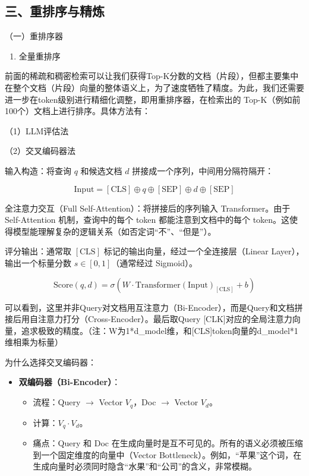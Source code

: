 \hypertarget{ux4e09ux91cdux6392ux5e8fux4e0eux7cbeux70bc}{%
\subsection{三、重排序与精炼}\label{ux4e09ux91cdux6392ux5e8fux4e0eux7cbeux70bc}}

（一）重排序器

\begin{enumerate}
\def\labelenumi{\arabic{enumi}.}
\tightlist
\item
  全量重排序
\end{enumerate}

前面的稀疏和稠密检索可以让我们获得Top-K分数的文档（片段），但都主要集中在整个文档（片段）向量的整体语义上，为了速度牺牲了精度。为此，我们还需要进一步在token级别进行精细化调整，即用重排序器，在检索出的 Top-K（例如前100个）文档上进行排序。具体方法有：

（1）LLM评估法

（2）交叉编码器法

输入构造：将查询 \(q\) 和候选文档 \(d\) 拼接成一个序列，中间用分隔符隔开：

\[
\mathrm{Input}=[\mathrm{CLS}]\oplus q\oplus[\mathrm{SEP}]\oplus d\oplus[\mathrm{SEP}]
\]

全注意力交互（Full Self-Attention）：将拼接后的序列输入 Transformer。由于 Self-Attention 机制，查询中的每个 token 都能注意到文档中的每个 token。这使得模型能理解复杂的逻辑关系（如否定词``不''、``但是''）。

评分输出：通常取 \([\mathrm{CLS}]\) 标记的输出向量，经过一个全连接层（Linear Layer），输出一个标量分数 \(s\in[0,1]\)（通常经过 Sigmoid）。

\[
\mathrm{Score}(q,d)=\sigma\left(W\cdot\mathrm{Transformer}(\mathrm{Input})_{[\mathrm{CLS}]}+b\right)
\]

可以看到，这里并非Query对文档用互注意力（Bi-Encoder），而是Query和文档拼接后用自注意力打分（Cross-Encoder）。最后取Query {[}CLK{]}对应的全局注意力向量，追求极致的精度。（注：W为1*d\_model维，和{[}CLS{]}token向量的d\_model*1维相乘为标量）

为什么选择交叉编码器：

\begin{itemize}
\tightlist
\item
  \textbf{双编码器（Bi-Encoder）}：

  \begin{itemize}
  \tightlist
  \item
    流程：Query \(\to\) Vector \(V_q\)，Doc \(\to\) Vector \(V_d\)。
  \item
    计算：\(V_q\cdot V_d\)。
  \item
    痛点：Query 和 Doc 在生成向量时是互不可见的。所有的语义必须被压缩到一个固定维度的向量中（Vector Bottleneck）。例如，``苹果''这个词，在生成向量时必须同时隐含``水果''和``公司''的含义，非常模糊。
  \end{itemize}
\end{itemize}

